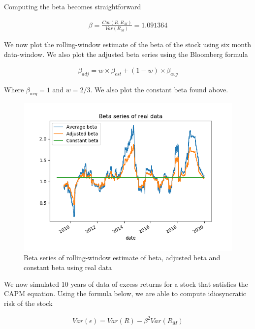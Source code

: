 \documentclass[10pt]{article}
\newenvironment{exercise}[2][Exercise]{\begin{trivlist}
  \item[\hskip \labelsep {\bfseries #1}\hskip \labelsep {\bfseries #2.}]}{\end{trivlist}}
\begin{document}
\begin{exercise}{2}
	\smallbreak
	
	Computing the beta becomes straightforward
	
	\begin{align*}
		\beta = \frac{Cov(R, R_{M})}{Var(R_{M})} = 1.091364
	\end{align*}

	We now plot the rolling-window estimate of the beta of the stock using six month data-window. We also plot the adjusted beta series using the Bloomberg formula 
	
	\begin{align*}
		\beta_{adj} = w \times \beta_{est} + (1 - w) \times \beta_{avg}
	\end{align*}
	
	Where $\beta_{avg} = 1 $ and $w = 2/3$. We also plot the constant beta found above.
	
	\begin{figure}[H]
	
		\centering
		\includegraphics[scale=0.8]{figures/ex2_2.png}	
		\caption{Beta series of rolling-window estimate of beta, adjusted beta and constant beta using real data}	
		\label{fig:ex2_2}
				
	\end{figure}	

	We now simulated 10 years of data of excess returns for a stock that satisfies the CAPM equation. Using the formula below, we are able to compute idiosyncratic risk of the stock
	
	\begin{align*}
		Var(\epsilon) = Var(R) - \beta^{2} Var(R_{M})
	\end{align*}
	

\end{exercise}
\end{document}

